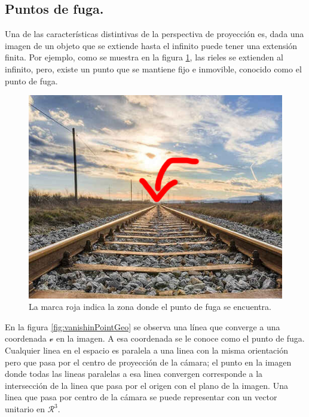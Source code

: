 \subsection{Puntos de fuga.}


Una de las características distintivas de la perspectiva de proyección es, dada una imagen de un objeto que se extiende hasta el infinito puede tener una extensión finita. Por ejemplo, como se muestra en la figura \ref{demoVanishingPoint}, las rieles se extienden al infinito, pero, existe un punto que se mantiene fijo e inmovible, conocido como el punto de fuga.

 \begin{figure}[h]
\centering
\includegraphics[scale=0.5]{GraficosEdArt/puntoFugaDemo.jpg}
\caption{La marca roja indica la zona donde el punto de fuga se encuentra.}
\label{demoVanishingPoint}
\end{figure}  

En la figura \ref{fig:vanishinPointGeo} se observa una línea que converge a una coordenada $\mathcal{v}$ en la imagen. A esa coordenada se le conoce como el punto de fuga. Cualquier linea en el espacio es paralela a una linea con la misma orientación pero que pasa por el centro de proyección de la cámara; el punto en la imagen donde todas las lineas paralelas a esa  linea convergen corresponde a la intersección de la linea que pasa por el origen con el plano de la imagen. Una linea  que pasa por centro de la cámara se puede representar con un vector unitario en $\mathcal{R}^3$.

